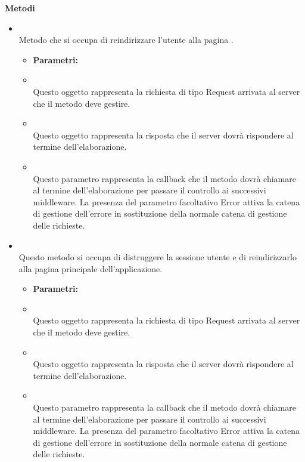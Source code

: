 		\textbf{Metodi} 
	\begin{itemize}
					\item[] \textbf{} \\ Metodo che si occupa di reindirizzare l'utente alla pagina .
						\begin{itemize}\addtolength{\itemsep}{-0.5\baselineskip}
						\item[] \textbf{Parametri:}
						\item[]  \\ Questo oggetto rappresenta la richiesta di tipo Request arrivata al server che il metodo deve gestire.	
						\item[]  \\ Questo oggetto rappresenta la risposta che il server dovrà rispondere al termine dell'elaborazione.	
						\item[]  \\ Questo parametro rappresenta la callback che il metodo dovrà chiamare al termine dell'elaborazione per passare il controllo ai successivi middleware. La presenza del parametro facoltativo Error attiva la catena di gestione dell'errore in sostituzione della normale catena di gestione delle richieste.	
				\end{itemize}
					\item[] \textbf{} \\ Questo metodo si occupa di distruggere la sessione utente e di reindirizzarlo alla pagina principale dell'applicazione.
						\begin{itemize}\addtolength{\itemsep}{-0.5\baselineskip}
						\item[] \textbf{Parametri:}
						\item[]  \\ Questo oggetto rappresenta la richiesta di tipo Request arrivata al server che il metodo deve gestire.	
						\item[]  \\ Questo oggetto rappresenta la risposta che il server dovrà rispondere al termine dell'elaborazione.	
						\item[]  \\ Questo parametro rappresenta la callback che il metodo dovrà chiamare al termine dell'elaborazione per passare il controllo ai successivi middleware. La presenza del parametro facoltativo Error attiva la catena di gestione dell'errore in sostituzione della normale catena di gestione delle richieste.	

\end{itemize}
\end{itemize}
